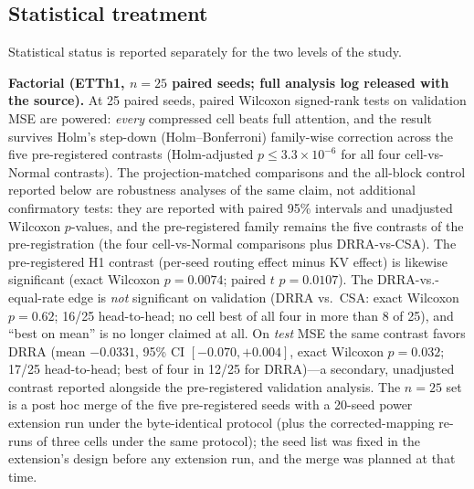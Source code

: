 \subsection{Statistical treatment}
\label{sec:stats}
Statistical status is reported separately for the two levels of the study.

\textbf{Factorial (ETTh1, $n{=}25$ paired seeds; full analysis log released
with the source).} At 25 paired seeds, paired Wilcoxon signed-rank
tests on validation MSE are powered: \emph{every} compressed cell beats
full attention, and the result survives Holm's step-down (Holm--Bonferroni)
family-wise correction across the five
pre-registered contrasts (Holm-adjusted $p \le 3.3\times10^{-6}$
for all four cell-vs-Normal contrasts). The projection-matched comparisons
and the all-block control reported below are robustness analyses of the same
claim, not additional confirmatory tests: they are reported with paired 95\% intervals and
unadjusted Wilcoxon $p$-values, and the pre-registered family remains the five
contrasts of the pre-registration (the four cell-vs-Normal comparisons plus
DRRA-vs-CSA).
The pre-registered H1 contrast (per-seed routing
effect minus KV effect) is likewise significant (exact Wilcoxon $p = 0.0074$;
paired $t$ $p = 0.0107$). The DRRA-vs.-equal-rate edge is \emph{not} significant
on validation (DRRA vs.\ CSA: exact Wilcoxon $p = 0.62$; 16/25 head-to-head; no cell
best of all four in more than 8 of 25), and ``best on mean'' is no longer claimed at all.
On \emph{test} MSE the same contrast favors DRRA (mean $-0.0331$,
95\% CI $[-0.070, +0.004]$, exact Wilcoxon $p = 0.032$; 17/25 head-to-head; best of
four in 12/25 for DRRA)---a secondary, unadjusted contrast reported alongside the
pre-registered validation analysis. The $n{=}25$ set is a post hoc merge of the five
pre-registered seeds with a 20-seed power extension run under the
byte-identical protocol (plus the corrected-mapping re-runs of three cells under the
same protocol); the seed list was fixed in the extension's design
before any extension run, and the merge was planned at that time.

